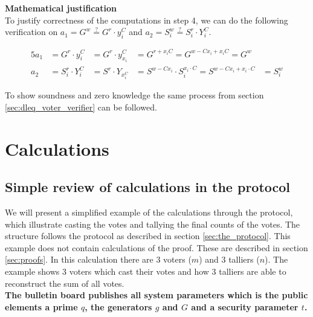  \noindent
\textbf{Mathematical justification}\\
To justify correctness of the computations in step 4, we can do the following verification on \begin{math}a_1=G^w \stackrel{?}{=} G^r \cdot y_i^C\end{math} and \begin{math}a_2=S_i^w \stackrel{?}{=} S_i^r \cdot Y_i^C\end{math}.


\begin{alignat*}{5}
a_1 &=G^r \cdot y_i^C &=G^r \cdot y_{x_i}^C &=G^{r+x_iC} =G^{w-Cx_i+x_iC} =G^w\\
a_2 &= S_i^r \cdot Y_i^C &=S^r \cdot Y_{x_i^C} &=S^{w-Cx_i} \cdot S_i^{x_i \cdot C} =S^{w-Cx_i+x_i \cdot C}&=S_i^w
\end{alignat*}



\noindent
To show soundness and zero knowledge the same process from section \ref{sec:dleq_voter_verifier} can be followed.


\chapter{Calculations}
\section{Simple review of calculations in the protocol}
\label{sec:simple_review_of_calculations_in_the_protocol}
We will present a simplified example of the calculations through the protocol, which illustrate casting the votes and tallying the final counts of the votes. The structure follows the protocol as described in section \ref{sec:the_protocol}. This example does not contain calculations of the proof. These are described in section \ref{sec:proofs}. In this calculation there are $3$ voters ($m$) and $3$ talliers ($n$). The example shows  3 voters which cast their votes and how 3 talliers are able to reconstruct the sum of all votes.\\

\noindent
\textbf{The bulletin board publishes all system parameters which is the public elements a prime $q$,  the generators $g$ and $G$ and a security parameter $t$.}


